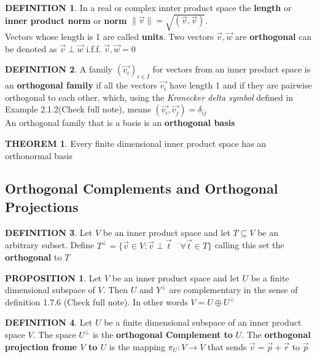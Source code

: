 \documentclass[12pt]{article}
\theoremstyle{definition}
\newtheorem{definition}{DEFINITION}[subsection]
\newtheorem{theorem}{THEOREM}[subsection]
\newcommand{\norm}[1]{\lVert #1 \rVert}
\newtheorem{prop}{PROPOSITION}[subsection]
\begin{document}
\begin{definition}
    In a real or complex innter product space the \textbf{length} or \textbf{inner product norm} or \textbf{norm} $\norm{\vec{v}} = \sqrt{(\vec{v},\vec{v})}$.\\
    Vectors whose length is 1 are called \textbf{units}. Two vectors $\vec{v},\vec{w}$ are \textbf{orthogonal} can be denoted as $\vec{v} \perp \vec{w}$ i.f.f. $\vec{v}, \vec{w} = 0$
\end{definition}

\begin{definition}
    A family $\left(\vec{v_i}\right)_{i\in I}$ for vectors from an inner product space is an \textbf{orthogonal family} if all the vectors $\vec{v_i}$ have length 1 and if they are pairwise orthogonal to each other, which, using the \textit{Kronecker delta symbol} defined in Example 2.1.2(Check full note), means $(\vec{v_i},\vec{v_j}) = \delta_{ij}$\\
    An orthogonal family that is a basis is an \textbf{orthogonal basis}
\end{definition}

\begin{theorem}
    Every finite dimensional inner product space has an orthonormal basis
\end{theorem}

\subsection{Orthogonal Complements and Orthogonal Projections}
\begin{definition}
    Let $V$ be an inner product space and let $T \subseteq V$ be an arbitrary subset. Define $T^\perp = \{\vec{v} \in V: \vec{v} \perp \vec{t} \quad\forall \vec{t} \in T\}$ calling this set the \textbf{orthogonal} to $T$
\end{definition}

\begin{prop}
    Let $V$ be an inner product space and let $U$ be a finite dimensional subspace of $V$. Then $U$ and $Y^\perp$ are complementary in the sense of definition 1.7.6 (Check full note). In other words $V = U \oplus U^\perp$
\end{prop}

\begin{definition}
    Let $U$ be a finite dimensional subspace of an inner product space $V$. The space $U^\perp$ is the \textbf{orthogonal Complement to} $U$. The \textbf{orthogonal projection frome $V$ to $U$} is the mapping $\pi_U:V \rightarrow V$ that sends $\vec{v} = \vec{p}+ \vec{r}$ to $\vec{p}$
\end{definition}
\end{document}
